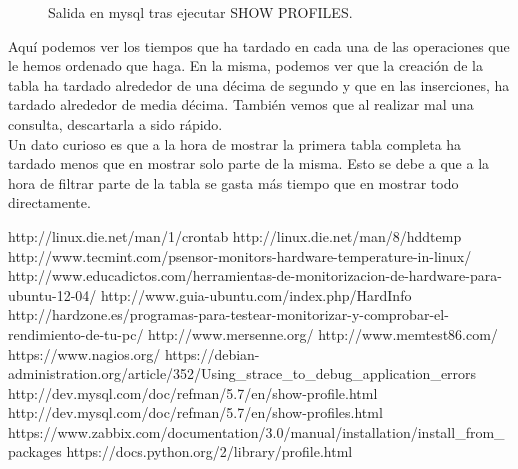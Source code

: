 \begin{itemize}
\begin{figure}[H]
	\caption[mysqlProfiles]{Salida en mysql tras ejecutar SHOW PROFILES.}
	\label{fig:mysqlProfiles}
	\end{figure}
	Aquí podemos ver los tiempos que ha tardado en cada una de las operaciones que le hemos ordenado que haga. En la misma, podemos ver que la creación de la tabla ha tardado alrededor de una décima de segundo y que en las inserciones, ha tardado alrededor de media décima. También vemos que al realizar mal una consulta, descartarla a sido rápido. \\
	Un dato curioso es que a la hora de mostrar la primera tabla completa  ha tardado menos que en mostrar solo parte de la misma. Esto se debe a que a la hora de filtrar parte de la tabla se gasta más tiempo que en mostrar todo directamente.

\end{itemize}
\newpage
\begin{thebibliography}{xx}
	 http://linux.die.net/man/1/crontab
	 http://linux.die.net/man/8/hddtemp
	 http://www.tecmint.com/psensor-monitors-hardware-temperature-in-linux/
	 http://www.educadictos.com/herramientas-de-monitorizacion-de-hardware-para-ubuntu-12-04/
	 http://www.guia-ubuntu.com/index.php/HardInfo
	 http://hardzone.es/programas-para-testear-monitorizar-y-comprobar-el-rendimiento-de-tu-pc/
	 http://www.mersenne.org/
	 http://www.memtest86.com/
	 https://www.nagios.org/
	 https://debian-administration.org/article/352/Using\_strace\_to\_debug\_application\_errors
	 http://dev.mysql.com/doc/refman/5.7/en/show-profile.html
	 http://dev.mysql.com/doc/refman/5.7/en/show-profiles.html
	 https://www.zabbix.com/documentation/3.0/manual/installation/install\_from\_packages
	 https://docs.python.org/2/library/profile.html
	
\end{thebibliography}
